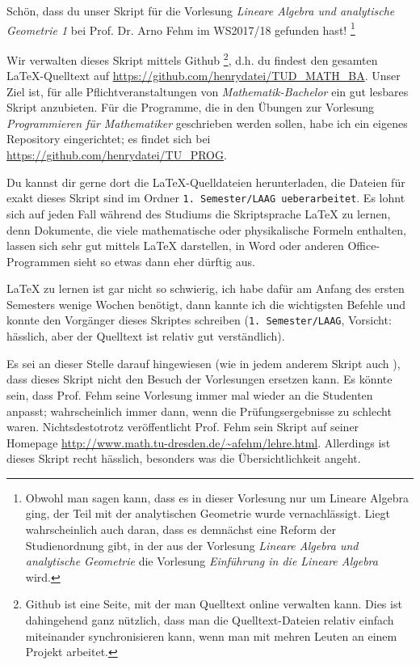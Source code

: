 Schön, dass du unser Skript für die Vorlesung \textit{Lineare Algebra und analytische Geometrie 1} bei Prof. Dr. Arno Fehm im WS2017/18 gefunden hast! \footnote{Obwohl man sagen kann, dass es in dieser Vorlesung nur um Lineare Algebra ging, der Teil mit der analytischen Geometrie wurde vernachlässigt. Liegt wahrscheinlich auch daran, dass es demnächst eine Reform der Studienordnung gibt, in der aus der Vorlesung \textit{Lineare Algebra und analytische Geometrie} die Vorlesung \textit{Einführung in die Lineare Algebra} wird.}

Wir verwalten dieses Skript mittels Github \footnote{Github ist eine Seite, mit der man Quelltext online verwalten kann. Dies ist dahingehend ganz nützlich, dass man die Quelltext-Dateien relativ einfach miteinander synchronisieren kann, wenn man mit mehren Leuten an einem Projekt arbeitet.}, d.h. du findest den gesamten \LaTeX-Quelltext auf \url{https://github.com/henrydatei/TUD_MATH_BA}. Unser Ziel ist, für alle Pflichtveranstaltungen von \textit{Mathematik-Bachelor} ein gut lesbares Skript anzubieten. Für die Programme, die in den Übungen zur Vorlesung \textit{Programmieren für Mathematiker} geschrieben werden sollen, habe ich ein eigenes Repository eingerichtet; es findet sich bei \url{https://github.com/henrydatei/TU_PROG}.

Du kannst dir gerne dort die \LaTeX-Quelldateien herunterladen, die Dateien für exakt dieses Skript sind im Ordner \texttt{1. Semester/LAAG ueberarbeitet}. Es lohnt sich auf jeden Fall während des Studiums die Skriptsprache \LaTeX{} zu lernen, denn Dokumente, die viele mathematische oder physikalische Formeln enthalten, lassen sich sehr gut mittels \LaTeX{} darstellen, in Word oder anderen Office-Programmen sieht so etwas dann eher dürftig aus.

\LaTeX{} zu lernen ist gar nicht so schwierig, ich habe dafür am Anfang des ersten Semesters wenige Wochen benötigt, dann kannte ich die wichtigsten Befehle und konnte den Vorgänger dieses Skriptes schreiben (\texttt{1. Semester/LAAG}, Vorsicht: hässlich, aber der Quelltext ist relativ gut verständlich).

Es sei an dieser Stelle darauf hingewiesen (wie in jedem anderem Skript auch \smiley{}), dass dieses Skript nicht den Besuch der Vorlesungen ersetzen kann. Es könnte sein, dass Prof. Fehm seine Vorlesung immer mal wieder an die Studenten anpasst; wahrscheinlich immer dann, wenn die Prüfungsergebnisse zu schlecht waren. Nichtsdestotrotz veröffentlicht Prof. Fehm sein Skript auf seiner Homepage \url{http://www.math.tu-dresden.de/~afehm/lehre.html}. Allerdings ist dieses Skript recht hässlich, besonders was die Übersichtlichkeit angeht.

